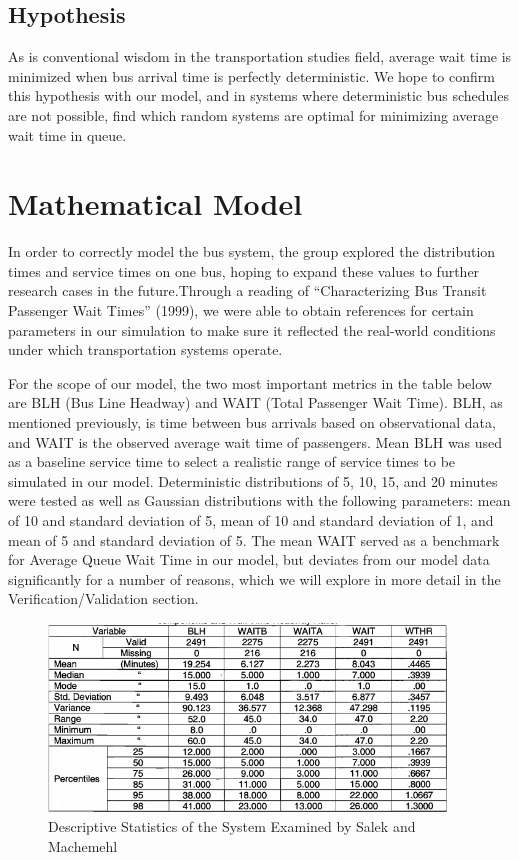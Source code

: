 \documentclass{article}
\begin{document}
\subsection{Hypothesis}
As is conventional wisdom in the transportation studies field, average wait time is minimized when bus arrival time is perfectly deterministic. We hope to confirm this hypothesis with our model, and in systems where deterministic bus schedules are not possible, find which random systems are optimal for minimizing average wait time in queue.


\section{Mathematical Model}
   In order to correctly model the bus system, the group explored the distribution times and service times on one bus, hoping to expand these values to further research cases in the future.Through a reading of “Characterizing Bus Transit Passenger Wait Times” (1999), we were able to obtain references for certain parameters in our simulation to make sure it reflected the real-world conditions under which transportation systems operate. 
  
For the scope of our model, the two most important metrics in the table below are BLH (Bus Line Headway) and WAIT (Total Passenger Wait Time). BLH, as mentioned previously, is time between bus arrivals based on observational data, and WAIT is the observed average wait time of passengers. Mean BLH was used as a baseline service time to select a realistic range of service times to be simulated in our model. Deterministic distributions of 5, 10, 15, and 20 minutes were tested as well as Gaussian distributions with the following parameters: mean of 10 and standard deviation of 5, mean of 10 and standard deviation of 1, and mean of 5 and standard deviation of 5. The mean WAIT served as a benchmark for Average Queue Wait Time in our model, but deviates from our model data significantly for a number of reasons, which we will explore in more detail in the Verification/Validation section. 

   
   \newpage
   \begin{figure}[h]
	\begin{center}
	\includegraphics[width=400px]{Paper_Data_Table_1.png}
	\caption{Descriptive Statistics of the System Examined by Salek and Machemehl}
	\end{center}
	\end{figure}
    
\end{document}
